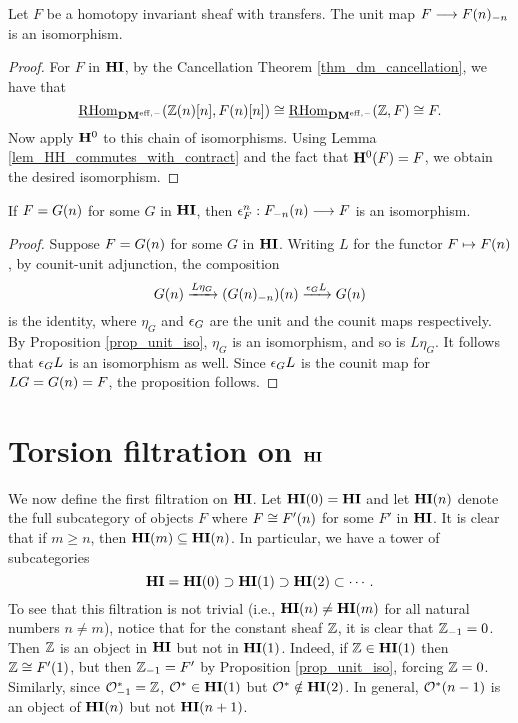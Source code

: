\begin{prop}\label{prop_unit_iso}
Let $F$ be a homotopy invariant sheaf with transfers. The unit map 
$F \to \RHI[n]{\LHI[n]{F}}$ is an isomorphism.
\end{prop}
\begin{proof}
For $F$ in $\HI$, by the Cancellation Theorem 
\ref{thm_dm_cancellation}, we have that 
\[
\ihomDMf(\Z(n)[n], F(n)[n]) \cong \ihomDMf(\Z, F) 
\cong F. 
\]
Now apply $\HH^0$ to this chain of isomorphisms. Using Lemma
\ref{lem_HH_commutes_with_contract} and the fact that $\HH^0(F) = 
F$, we obtain the desired isomorphism.
\end{proof}

\begin{prop}\label{prop_counit_iso_for_HIn}
If $F = \LHI[n]{G}$ for some $G$ in $\HI$, then $\cuHI^n_F : 
\LHI[n]{\RHI[n]{F}} \to F$ is an isomorphism.
\end{prop}
\begin{proof}
Suppose $F = \LHI[n]{G}$ for some $G$ in $\HI$. Writing $L$ for 
the functor 
$F \mapsto \LHI[n]F$, by counit-unit adjunction, the composition
\[
\LHI[n]{G} \xrightarrow{L\eta_G} \LHI[n]{(\RHI[n]{\LHI[n]{G}})}
   \xrightarrow{\cuHI_G L} \LHI[n]{G}
\]
is the identity, where $\eta_{G}$ and $\cuHI_{G}$ are the unit and 
the counit maps respectively. By Proposition \ref{prop_unit_iso}, 
$\eta_{G}$ is an isomorphism, and so is $L\eta_{G}$. It follows
that $\cuHI_G L$ is an isomorphism as well. Since $\cuHI_G L$ is the 
counit map for $LG = \LHI[n]{G} = F$, the proposition follows.
\end{proof}

\section{Torsion filtration on $\HI$}
\label{sect_torsion_filt_on_HI}

We now define the first filtration on $\HI$. Let $\LHI[0]{\HI} = 
\HI$ and let $\LHI[n]{\HI}$ denote the full subcategory of objects 
$F$ where $F \cong \LHI[n]{F'}$ for some $F'$ in $\HI$. It is clear 
that if $m \geq n$, then $\LHI[m]{\HI} \subseteq \LHI[n]{\HI}$. 
In particular, we have a tower of subcategories
\[
\HI = \LHI[0]{\HI} \supset \LHI[1]{\HI} \supset \LHI[2]{\HI} 
\subset \cdots.
\]
To see that this filtration is not trivial (i.e., $\LHI[n]{\HI} \neq
\LHI[m]{\HI}$ for all natural numbers $n \neq m$), notice that
for the constant sheaf $\Z$, it is clear that $\RHI{\Z} = 0$. 
Then $\Z$ is an object in $\HI$ but not in $\LHI{\HI}$. Indeed, if 
$\Z \in \LHI{\HI}$ then $\Z \cong \LHI{F'}$, but then $\RHI{\Z} = F'$ 
by Proposition \ref{prop_unit_iso}, forcing $\Z = 0$. Similarly, 
since $\RHI{\Ox} = \Z$, $\Ox \in \LHI{\HI}$ but $\Ox \notin
\LHI[2]{\HI}$. In general, $\LHI[n - 1]{\Ox}$ is an object of
$\LHI[n]{\HI}$ but not $\LHI[n + 1]{\HI}$.

